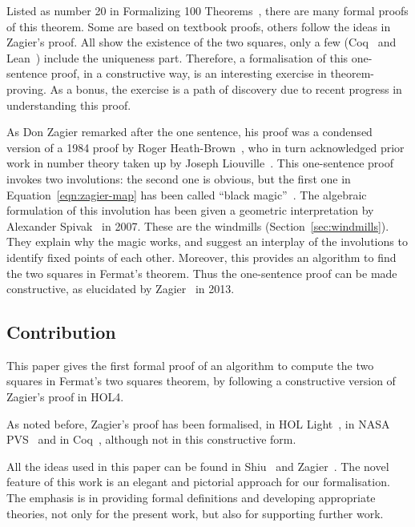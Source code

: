 \documentclass[sigplan,screen]{acmart}
\newcommand{\m}[1]{\todo[fancyline,color=blue!40,size=\scriptsize]{\textsf{JC: #1}}} %
\begin{document}
Listed as number 20 in Formalizing 100 Theorems~\cite{Wiedijk-2020},
there are many formal proofs of this theorem.
Some are based on textbook proofs, others follow the ideas in Zagier's proof.
All show the existence of the two squares, only a few (Coq~\cite{Thery-2004} and Lean~\cite{Hughes-2019}) include the uniqueness part.
Therefore, a formalisation of this one-sentence proof, in a constructive way, is an interesting exercise in theorem-proving.
As a bonus, the exercise is a path of discovery due to recent progress in understanding this proof.

As Don Zagier remarked after the one sentence, his proof was a condensed version of a 1984 proof by Roger Heath-Brown~\cite{Heath-Brown-1984-acm}, who in turn acknowledged prior work in number theory taken up by Joseph Liouville~\cite{Williams-2010-alt}.
This one-sentence proof invokes two involutions: the second one is obvious, but the first one in Equation~\eqref{eqn:zagier-map} has been called ``black magic''~\cite{Trimble-Lama-2008}. The algebraic formulation of this involution has been given a geometric interpretation by Alexander Spivak~\cite{Spivak-2007} in 2007. These are the windmills (Section~\ref{sec:windmills}). They explain why the magic works, and suggest an interplay of the involutions to identify fixed points of each other. Moreover, this provides an algorithm to find the two squares in Fermat's theorem.
Thus the one-sentence proof can be made constructive, as elucidated by Zagier~\cite{Zagier-2013-acm} in 2013.

\subsection{Contribution}
\label{sec:contribution}
This paper gives the first formal proof of an algorithm to compute the two squares in Fermat's two squares theorem, by following a constructive version of Zagier's proof in HOL4.

As noted before, Zagier's proof has been formalised, in HOL Light~\cite{Harrison-2010}, in NASA PVS~\cite{Narkawicz-2012-acm} and in Coq~\cite{Dubach-Muehlboeck-2021-acm}, although not in this constructive form.

All the ideas used in this paper can be found in Shiu~\cite{Shiu-1996} and Zagier~\cite{Zagier-2013-acm}.
The novel feature of this work is an elegant and pictorial approach for our formalisation.
The emphasis is in providing formal definitions and developing appropriate theories, not only for the present work, but also for supporting further work.
\end{document}
